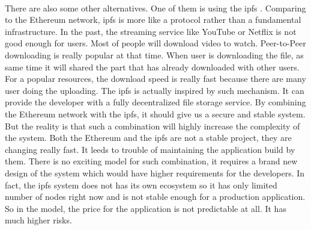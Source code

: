 \documentclass[openany,12pt]{ecsthesis}      %
\begin{document}
\paragraph{}
There are also some other alternatives. One of them is using the ipfs \cite{benet2014ipfs}. Comparing to the Ethereum network, 
ipfs is more like a protocol rather than a fundamental infrastructure. In the past, the streaming service like YouTube or Netflix is not good enough for users. 
Most of people will download video to watch. Peer-to-Peer downloading is really popular at that time. 
When user is downloading the file, 
as same time it will shared the part that has already downloaded with other users.
For a popular resources, the download speed is really fast because there are many user doing the uploading.
The ipfs is actually inspired by such mechanism. It can provide the developer with a fully decentralized file storage service.
By combining the Ethereum network with the ipfs, it should give us a secure and stable system. But the reality is that such a combination will highly increase the complexity of the system.
Both the Ethereum and the ipfs are not a stable project, they are changing really fast. It leeds to trouble of maintaining the application build by them. 
There is no exciting model for such combination, 
it requires a brand new design of the system which would have higher requirements for the developers. 
In fact, 
the ipfs system does not has its own ecosystem so it has only limited number of nodes right now 
and is not stable enough for a production application. 
So in the model, the price for the application is not predictable at all. It has much higher risks.
\end{document}

